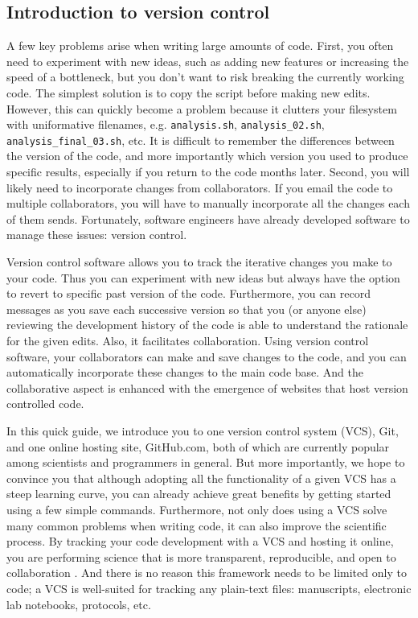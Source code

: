 \subsection{Introduction to version control}

A few key problems arise when writing large amounts of code. First, you often need to experiment with new ideas, such as adding new features or increasing the speed of a bottleneck, but you don't want to risk breaking the currently working code. The simplest solution is to copy the script before making new edits. However, this can quickly become a problem because it clutters your filesystem with uniformative filenames, e.g. \verb|analysis.sh|, \verb|analysis_02.sh|, \verb|analysis_final_03.sh|, etc. It is difficult to remember the differences between the version of the code, and more importantly which version you used to produce specific results, especially if you return to the code months later. Second, you will likely need to incorporate changes from collaborators. If you email the code to multiple collaborators, you will have to manually incorporate all the changes each of them sends. Fortunately, software engineers have already developed software to manage these issues: version control.

Version control software allows you to track the iterative changes you make to your code. Thus you can experiment with new ideas but always have the option to revert to specific past version of the code. Furthermore, you can record messages as you save each successive version so that you (or anyone else) reviewing the development history of the code is able to understand the rationale for the given edits. Also, it facilitates collaboration. Using version control software, your collaborators can make and save changes to the code, and you can automatically incorporate these changes to the main code base. And the collaborative aspect is enhanced with the emergence of websites that host version controlled code.

In this quick guide, we introduce you to one version control system (VCS), Git, and one online hosting site, GitHub.com, both of which are currently popular among scientists and programmers in general. But more importantly, we hope to convince you that although adopting all the functionality of a given VCS has a steep learning curve, you can already achieve great benefits by getting started using a few simple commands. Furthermore, not only does using a VCS solve many common problems when writing code, it can also improve the scientific process. By tracking your code development with a VCS and hosting it online, you are performing science that is more transparent, reproducible, and open to collaboration \cite{23448176}. And there is no reason this framework needs to be limited only to code; a VCS is well-suited for tracking any plain-text files: manuscripts, electronic lab notebooks, protocols, etc.